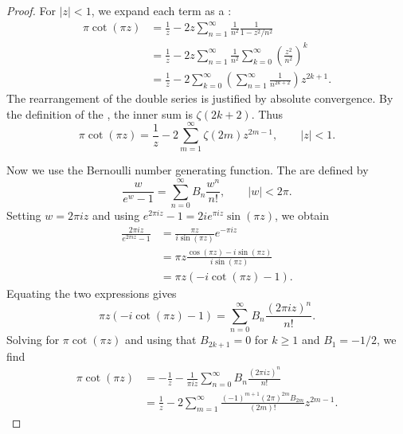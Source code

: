 \begin{corollary}
\begin{proof}
For $|z| < 1$, we expand each term as a :
\begin{align*}
\pi \cot(\pi z) &= \frac{1}{z} - 2z \sum_{n=1}^\infty \frac{1}{n^2} \frac{1}{1 - z^2/n^2} \\
&= \frac{1}{z} - 2z \sum_{n=1}^\infty \frac{1}{n^2} \sum_{k=0}^\infty \left( \frac{z^2}{n^2} \right)^k \\
&= \frac{1}{z} - 2 \sum_{k=0}^\infty \left( \sum_{n=1}^\infty \frac{1}{n^{2k+2}} \right) z^{2k+1}.
\end{align*}
The rearrangement of the double series is justified by absolute convergence. By the definition of the , the inner sum is $\zeta(2k+2)$. Thus
\begin{equation} \label{eq:cotangent_expansion}
\pi \cot(\pi z) = \frac{1}{z} - 2 \sum_{m=1}^\infty \zeta(2m) z^{2m-1}, \qquad |z| < 1.
\end{equation}

Now we use the Bernoulli number generating function. The  are defined by
$$
\frac{w}{e^w - 1} = \sum_{n=0}^\infty B_n \frac{w^n}{n!}, \qquad |w| < 2\pi.
$$
Setting $w = 2\pi i z$ and using $e^{2\pi i z} - 1 = 2i e^{\pi i z} \sin(\pi z)$, we obtain
\begin{align*}
\frac{2\pi i z}{e^{2\pi i z} - 1} &= \frac{\pi z}{i \sin(\pi z)} e^{-\pi i z} \\
&= \pi z \frac{\cos(\pi z) - i \sin(\pi z)}{i \sin(\pi z)} \\
&= \pi z \left( -i \cot(\pi z) - 1 \right).
\end{align*}
Equating the two expressions gives
$$
\pi z \left( -i \cot(\pi z) - 1 \right) = \sum_{n=0}^\infty B_n \frac{(2\pi i z)^n}{n!}.
$$
Solving for $\pi \cot(\pi z)$ and using that $B_{2k+1} = 0$ for $k \ge 1$ and $B_1 = -1/2$, we find
\begin{align*}
\pi \cot(\pi z) &= -\frac{1}{z} - \frac{1}{\pi i z} \sum_{n=0}^\infty B_n \frac{(2\pi i z)^n}{n!} \\
&= \frac{1}{z} - 2 \sum_{m=1}^\infty \frac{(-1)^{m+1} (2\pi)^{2m} B_{2m}}{(2m)!} z^{2m-1}.
\end{align*}


\end{proof}
\end{corollary}
